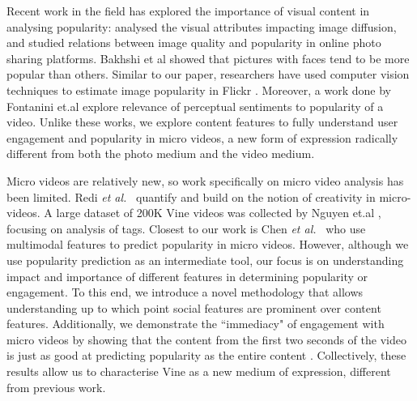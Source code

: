 Recent work in the field has explored the importance of visual content in analysing popularity: \cite{totti14impact} analysed the visual attributes impacting image diffusion,  and \cite{schifanella2015image} studied relations between image quality and popularity in online photo sharing platforms.  Bakhshi et al  \cite{bakhshi2014faces} showed that pictures with faces tend to be more popular than others. Similar to our paper, researchers have used computer vision techniques to estimate image popularity in Flickr \cite{Khosla:2014}. Moreover, a work done by Fontanini et.al \cite{fontanini2016web} explore relevance of perceptual sentiments to popularity of a video. 
Unlike these works, we  explore content features to fully understand user engagement and popularity in micro videos, a new form of expression radically different from both the photo medium and the video medium.%

Micro videos are relatively new, so work specifically on micro video analysis has been limited. Redi \textsl{et al.}~\cite{redi20146} quantify and build on the notion of creativity in micro-videos. A large dataset of 200K Vine videos was collected by Nguyen et.al \cite{nguyen2016open}, focusing on analysis of tags. Closest to our work is Chen \textsl{et al.}~\cite{Chen:2016:MTM:2964284.2964314} who use multimodal features to predict popularity in micro videos. However, although we use popularity prediction as an intermediate tool, our focus is on understanding impact and importance of different features in determining popularity or engagement. To this end, we introduce a novel methodology 
that allows understanding up to which point social features are prominent over content features. Additionally, we demonstrate the ``immediacy" of engagement with micro videos by showing that the content from the first two seconds of the video is just as good at predicting  popularity as the entire content 
. Collectively, these results allow us to characterise Vine as a new medium of expression, different from previous work. %
\\
\\


